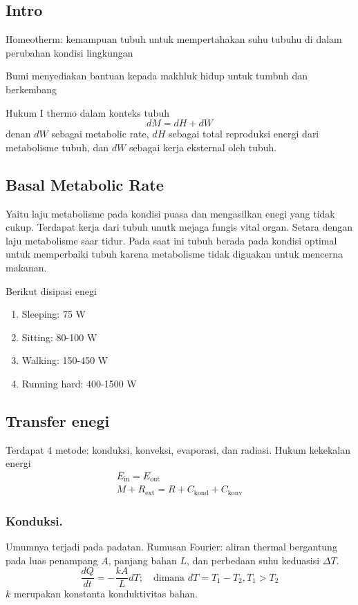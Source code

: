 \documentclass[../../main.tex]{subfiles}
\begin{document}
\subsection{Intro}
Homeotherm: kemampuan tubuh untuk mempertahakan suhu tubuhu di dalam perubahan kondisi lingkungan

Bumi menyediakan bantuan kepada makhluk hidup untuk tumbuh dan berkembang

Hukum I thermo dalam konteks tubuh
\begin{equation*}
    dM=dH+dW
\end{equation*}
denan $dW$ sebagai metabolic rate, $dH$ sebagai total reproduksi energi dari metabolisme tubuh, dan $dW$ sebagai kerja eksternal oleh tubuh. 

\subsection{Basal Metabolic Rate}
Yaitu laju metabolisme pada kondisi puasa dan mengasilkan enegi yang tidak cukup. Terdapat kerja dari tubuh unutk mejaga fungis vital organ. Setara dengan laju metabolisme saar tidur. Pada saat ini tubuh berada pada kondisi optimal untuk memperbaiki tubuh karena metabolisme tidak diguakan untuk mencerna makanan.

Berikut disipasi enegi
\begin{enumerate}
    \item Sleeping: 75 W 
    \item Sitting: 80-100 W 
    \item Walking: 150-450 W 
    \item Running hard: 400-1500 W 
\end{enumerate}

\subsection{Transfer enegi}
Terdapat 4 metode: konduksi, konveksi, evaporasi, dan radiasi. Hukum kekekalan energi 
\begin{align*}
    E_\text{in}=E_\text{out}\\
    M+R_\text{ext}=R+C_\text{kond}+C_\text{konv}
\end{align*}

\subsubsection{Konduksi.} Umumnya terjadi pada padatan. Rumusan Fourier: aliran thermal bergantung pada luas penampang $A$, panjang bahan $L$, dan perbedaan suhu keduasisi $\Delta T$. 
\begin{equation*}
    \frac{dQ}{dt}=-\frac{kA}{L}dT;\quad\text{dimana }dT=T_1-T_2,T_1>T_2
\end{equation*}
$k$ merupakan konstanta konduktivitas bahan. 
\end{document}
